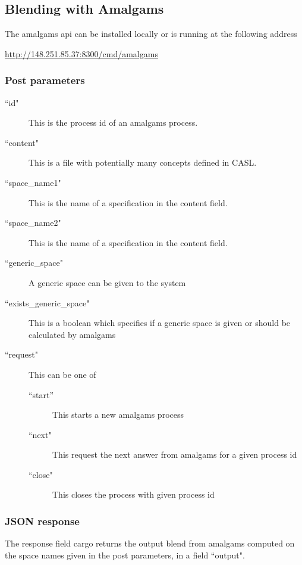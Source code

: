 \subsection{Blending with Amalgams}

The amalgams api can be installed locally or is running at the following address
\begin{center}
\url{http://148.251.85.37:8300/cmd/amalgams}
\end{center}

\subsubsection{Post parameters}

\begin{description}
\item[``id"] This is the process id of an amalgams process.
\item[``content"] This is a file with potentially many concepts defined in CASL.
\item[``space\_name1"]  This is the name of a specification in the content field.
\item[``space\_name2"] This is the name of a specification in the content field.
\item[``generic\_space"] A generic space can be given to the system
\item[``exists\_generic\_space"] This is a boolean which specifies if a generic space is given or should be calculated by amalgams
\item[``request"] This can be one of
\begin{description}
\item[``start''] This starts a new amalgams process
\item[``next"] This request the next answer from amalgams for a given process id
\item[``close"] This closes the process with given process id
\end{description}
\end{description}

\subsubsection{JSON response}

The response field cargo returns the output blend from amalgams computed on the space names given in the post parameters, in a field ``output".
